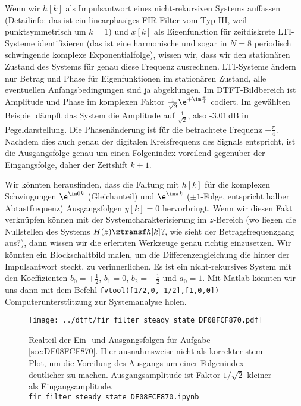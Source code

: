 \begin{Loesung}
Wenn wir $h[k]$ als Impulsantwort eines nicht-rekursiven Systems auffassen
(Detailinfo: das ist ein linearphasiges FIR Filter vom Typ III, weil punktsymmetrisch um $k=1$)
und $x[k]$ als Eigenfunktion für zeitdiskrete LTI-Systeme identifizieren
(das ist eine harmonische und sogar in $N=8$ periodisch schwingende komplexe
Exponentialfolge), wissen wir, dass wir den stationären Zustand des Systems
für genau diese Frequenz ausrechnen.
%
LTI-Systeme ändern nur Betrag und Phase für Eigenfunktionen im stationären Zustand,
alle eventuellen Anfangsbedingungen sind ja abgeklungen.
%
Im DTFT-Bildbereich ist Amplitude und Phase im komplexen Faktor
$\frac{1}{\sqrt{2}} \e^{+\im\frac{\pi}{4}}$
codiert.
%
Im gewählten Beispiel dämpft das System die Amplitude auf $\frac{1}{\sqrt{2}}$,
also -3.01\,dB in Pegeldarstellung.
%
Die Phasenänderung ist für die betrachtete Frequenz $+\frac{\pi}{4}$.
Nachdem dies auch genau der digitalen Kreisfrequenz des Signals entspricht,
ist die Ausgangsfolge
genau um einen Folgenindex voreilend gegenüber der Eingangsfolge, daher der
Zeitshift $k+1$.
%

Wir könnten herausfinden, dass die Faltung mit $h[k]$ für die komplexen
Schwingungen $\e^{\im 0 k}$ (Gleichanteil) und $\e^{\im \pi k}$ ($\pm 1$-Folge,
entspricht halber Abtastfrequenz) Ausgangsfolgen $y[k]=0$ hervorbringt.
%
Wenn wir diesen Fakt verknüpfen können mit der Systemcharakterisierung
im $z$-Bereich (wo liegen die Nullstellen des Systems $H(z) \ztransf h[k]$?,
wie sieht der Betragsfrequenzgang aus?),
dann wissen wir die erlernten Werkzeuge genau richtig einzusetzen.
%
Wir könnten ein Blockschaltbild malen, um die Differenzengleichung die hinter
der Impulsantwort steckt, zu verinnerlichen.
%
Es ist ein nicht-rekursives System mit den Koeffizienten $b_0=+\frac{1}{2}$, $b_1=0$,
$b_2=-\frac{1}{2}$ und $a_0=1$.
%
Mit Matlab könnten wir uns dann mit dem Befehl \texttt{fvtool([1/2,0,-1/2],[1,0,0])}
Computerunterstützung zur Systemanalyse holen.
\end{Loesung}

\begin{figure}
\centering
\texttt{[image: ../dtft/fir\_filter\_steady\_state\_DF08FCF870.pdf]}
\caption{Realteil der Ein- und Ausgangsfolgen für Aufgabe \ref{sec:DF08FCF870}.
Hier ausnahmsweise nicht als korrekter stem Plot, um die Voreilung des Ausgangs
um einer Folgenindex deutlicher zu machen. Ausgangsamplitude ist Faktor
$1/\sqrt{2}$ kleiner als Eingangsamplitude.
\texttt{fir\_filter\_steady\_state\_DF08FCF870.ipynb}}
\label{fig:DF08FCF870}
\end{figure}



